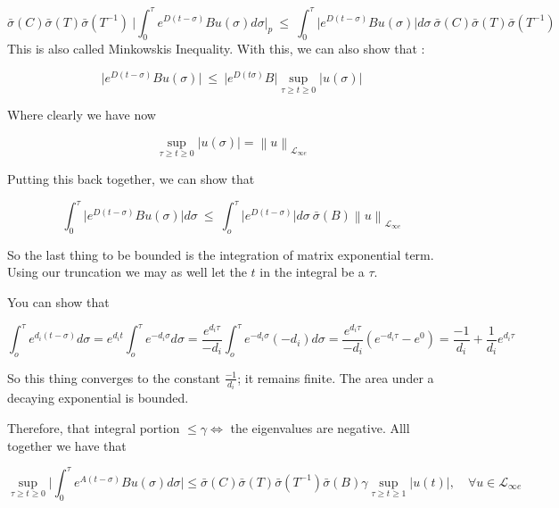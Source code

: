 \documentclass[11pt]{article}
\newcommand{\norm}[1]{\left\lVert#1\right\rVert}
\begin{document}
\begin{equation}
	\bar{\sigma}(C) \bar{\sigma}(T) \bar{\sigma}(T^{-1})   \ \bigg \rvert \int_0^\tau e^{D(t-\sigma)}Bu(\sigma)d\sigma \bigg \rvert_p \ \leq \ \int_0^\tau \bigg \rvert e^{D(t-\sigma)} B u(\sigma) \bigg \rvert d\sigma \  \bar{\sigma}(C) \bar{\sigma}(T) \bar{\sigma}(T^{-1})
\end{equation}
This is also called Minkowskis Inequality.	With this, we can also show that :

\begin{equation}
	\bigg \rvert e^{D(t-\sigma)} B u(\sigma) \bigg \rvert \ \leq \ \bigg \rvert e^{D(t\sigma)}B \bigg \rvert \sup_{\tau \geq t \geq 0} \big \rvert u(\sigma) \big \rvert
\end{equation}
 

Where clearly we have now

\begin{equation}
\sup_{\tau \geq t \geq 0} \big \rvert u(\sigma) \big \rvert = \norm{u}_{\mathcal{L}_{\infty e}}
\end{equation}

Putting this back together, we can show that

\begin{equation}
\int_0^\tau \bigg \rvert e^{D(t-\sigma)} B u(\sigma) \bigg \rvert d\sigma \ \leq \ \int_o^\tau \big \rvert e^{D(t-\sigma)} \big \rvert d\sigma \ \bar{\sigma}(B) \norm{u}_{\mathcal{L}_{\infty e}}
\end{equation}

So the last thing to be bounded is the integration of matrix exponential term. Using our truncation we may as well let the $t$ in the integral be a $\tau$.

You can show that 

\begin{equation}
	\int_o^\tau e^{d_i(t-\sigma)} d\sigma = e^{d_it} \int_o^\tau e^{-d_i \sigma} d\sigma = \frac{e^{d_i \tau}}{-d_i} \int_o^\tau e^{-d_i\sigma} (-d_i)d\sigma = \frac{e^{d_i\tau}}{-d_i}(e^{-d_i\tau} - e^{0}) = \frac{-1}{d_i} + \frac{1}{d_i}e^{d_i\tau} 
\end{equation}

So this thing converges to the constant $\frac{-1}{d_i}$; it remains finite. The area under a decaying exponential is bounded.

Therefore, that integral portion $\leq \gamma \iff$ the eigenvalues are negative. Alll together we have that  

\begin{equation}
\sup_{\tau \geq t \geq 0} \bigg \rvert \int_0^\tau e^{A(t-\sigma)}Bu(\sigma) d\sigma \bigg \rvert \leq \bar{\sigma}(C)\bar{\sigma}(T)\bar{\sigma}(T^{-1})\bar{\sigma}(B) \gamma \sup_{\tau \geq t \geq 1} \rvert u(t) \rvert,\quad \forall u \in \mathcal{L}_{\infty e}
\end{equation}
\end{document}
